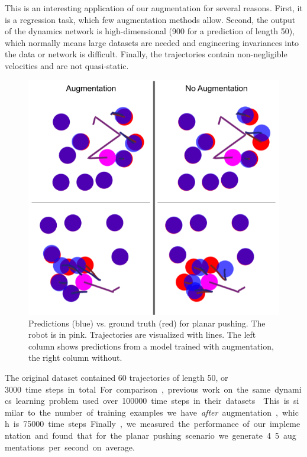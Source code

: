 This is an interesting application of our augmentation for several reasons. First, it is a regression task, which few augmentation methods allow. Second, the output of the dynamics network is high-dimensional (900 for a prediction of length 50), which normally means large datasets are needed and engineering invariances into the data or network is difficult. Finally, the trajectories contain non-negligible velocities and are not quasi-static.

\begin{figure}
    \centering
    \includegraphics[width=0.6\linewidth]{Chap3/images/cylinders_rollouts.png}
    \caption{Predictions (blue) vs. ground truth (red) for planar pushing. The robot is in pink. Trajectories are visualized with lines. The left column shows predictions from a model trained with augmentation, the right column without.}
    \label{RSS:fig:cylinders_rollouts}
\end{figure}

The original dataset contained 60 trajectories of length 50, or \SI{3000} time steps in total. For comparison, previous work on the same dynamics learning problem used over \SI{100000} time steps in their datasets \cite{Propnet,DBRP2020}. This is similar to the number of training examples we have \textit{after} augmentation, which is \SI{75000} time steps. Finally, we measured the performance of our implementation and found that for the planar pushing scenario we generate 4.5 augmentations per second on average.

